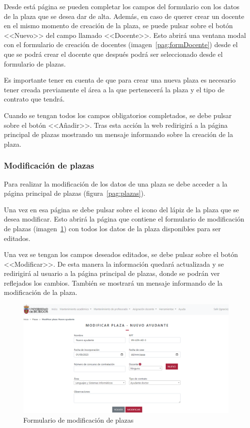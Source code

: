 Desde está página se pueden completar los campos del formulario con los datos de la plaza que se desea dar de alta. 
Además, en caso de querer crear un docente en el mismo momento de creación de la plaza, se puede pulsar sobre el botón <<Nuevo>> del campo llamado <<Docente>>.
Esto abrirá una ventana modal con el formulario de creación de docentes (imagen~\ref{pag:formDocente}) desde el que se podrá crear el docente que después podrá ser seleccionado desde el formulario de plazas.

Es importante tener en cuenta de que para crear una nueva plaza es necesario tener creada previamente el área a la que pertenecerá la plaza y el tipo de contrato que tendrá.

Cuando se tengan todos los campos obligatorios completados, se debe pulsar sobre el botón <<Añadir>>.
Tras esta acción la web redirigirá a la página principal de plazas mostrando un mensaje informando sobre la creación de la plaza.

\subsubsection{Modificación de plazas}
Para realizar la modificación de los datos de una plaza se debe acceder a la página principal de plazas (figura~\ref{pag:plazas}).

Una vez en esa página se debe pulsar sobre el icono del lápiz de la plaza que se desea modificar.
Esto abrirá la página que contiene el formulario de modificación de plazas (imagen~\ref{pag:formModPlaza}) con todos los datos de la plaza disponibles para ser editados.

Una vez se tengan los campos deseados editados, se debe pulsar sobre el botón <<Modificar>>.
De esta manera la información quedará actualizada y se redirigirá al usuario a la página principal de plazas, donde se podrán ver reflejados los cambios. 
También se mostrará un mensaje informando de la modificación de la plaza.

\begin{figure}
	\centering
	\includegraphics[width=\textwidth]{../img/Anexos/Manual usuario/formModPlaza.png}
	\caption{Formulario de modificación de plazas}\label{pag:formModPlaza}
\end{figure}

